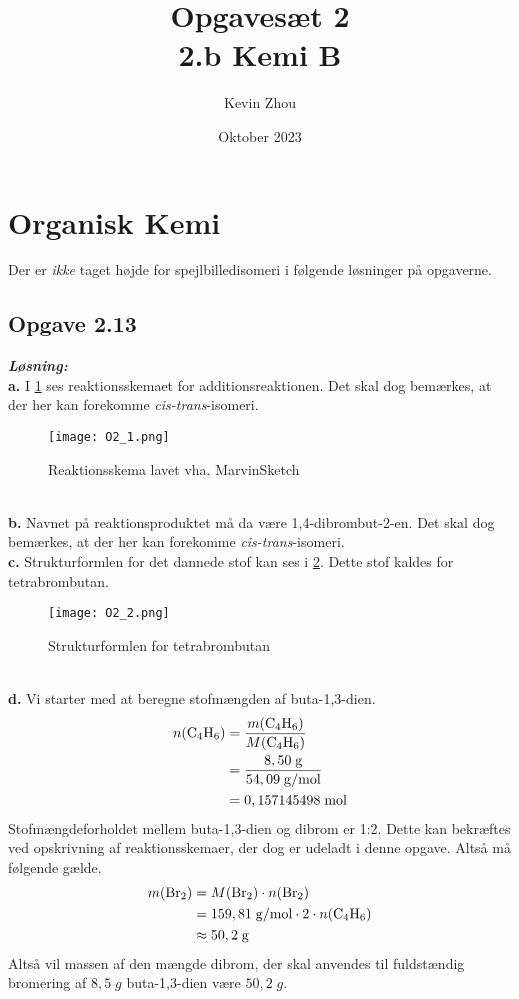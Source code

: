 \documentclass{report}
\title{Opgavesæt 2\\
{\Large \textbf{2.b Kemi B}}}
\author{Kevin Zhou}
\date{Oktober 2023}
\newcommand{\sol}{\setlength{\parindent}{0cm}\textbf{\textit{Løsning:}}\setlength{\parindent}{1cm}}
\begin{document}
\maketitle
\chapter*{Organisk Kemi}
\begin{note}
  Der er \emph{ikke} taget højde for spejlbilledisomeri i følgende løsninger på opgaverne.
\end{note}
\section*{Opgave 2.13}
\sol \\ 
\textbf{a.} I \cref{fig:1} ses reaktionsskemaet for additionsreaktionen. Det skal dog bemærkes, at der her kan forekomme \textit{cis-trans}-isomeri.
\begin{figure}[h]
\begin{center}
  \texttt{[image: O2\_1.png]}
\end{center}
\caption{Reaktionsskema lavet vha. MarvinSketch}
\label{fig:1}
\end{figure} \\
\textbf{b.} Navnet på reaktionsproduktet må da være 1,4-dibrombut-2-en. Det skal dog bemærkes, at der her kan forekomme \textit{cis-trans}-isomeri. \\[1ex]
\textbf{c.} Strukturformlen for det dannede stof kan ses i \cref{fig:2}.
Dette stof kaldes for tetrabrombutan.
\begin{figure}[h]
\begin{center}
  \texttt{[image: O2\_2.png]}
\end{center}
\caption{Strukturformlen for tetrabrombutan}
\label{fig:2}
\end{figure}\\ 
\textbf{d.} Vi starter med at beregne stofmængden af buta-1,3-dien.
\begin{equation*}
\begin{split}
  n(\ce{C4H6})&=\frac{m(\ce{C4H6})}{M(\ce{C4H6})}\\ 
  &= \frac{8,50 \;\unit{g} }{54,09\;\unit{g/mol} }\\ 
  &= 0,157145498\;\unit{mol} 
\end{split}
\end{equation*}
Stofmængdeforholdet mellem buta-1,3-dien og dibrom er 1:2. Dette kan bekræftes ved opskrivning af reaktionsskemaer, der dog er udeladt i denne opgave. Altså må følgende gælde.
\begin{equation*}
\begin{split}
  m(\ce{Br2}) &= M(\ce{Br2}) \cdot n(\ce{Br2})\\ 
  &= 159,81 \;\unit{g/mol} \cdot 2 \cdot n(\ce{C4H6})\\ 
  &\approx 50,2 \;\unit{g} 
\end{split}
\end{equation*}
Altså vil massen af den mængde dibrom, der skal anvendes til fuldstændig bromering af $8,5 \;\unit{g} $ buta-1,3-dien være $50,2 \;\unit{g} $.
\end{document}

